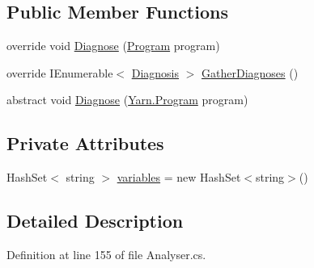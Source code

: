 \subsection*{Public Member Functions}
\begin{DoxyCompactItemize}
\item 
override void \hyperlink{a00183_a980f0e64bc5ad171c35ec19bdf838b5c}{Diagnose} (\hyperlink{a00146}{Program} program)
\item 
override I\-Enumerable$<$ \hyperlink{a00085}{Diagnosis} $>$ \hyperlink{a00183_ab84e7a8e68740379dee12a51dca69b07}{Gather\-Diagnoses} ()
\item 
abstract void \hyperlink{a00047_aba4a36cb823b11ee491074e26477d084}{Diagnose} (\hyperlink{a00146}{Yarn.\-Program} program)
\end{DoxyCompactItemize}
\subsection*{Private Attributes}
\begin{DoxyCompactItemize}
\item 
Hash\-Set$<$ string $>$ \hyperlink{a00183_a64ed6c3394c474b6cf5804a35f560746}{variables} = new Hash\-Set$<$string$>$()
\end{DoxyCompactItemize}


\subsection{Detailed Description}


Definition at line 155 of file Analyser.\-cs.



